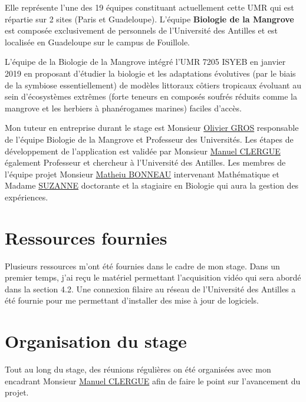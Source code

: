     \vspace{0.5cm}

    \begin{flushleft}
        Elle représente l'une des 19 équipes constituant actuellement cette UMR qui est répartie sur 2 sites (Paris et Guadeloupe). L'équipe \textbf{Biologie de la Mangrove} est composée exclusivement de personnels de l'Université des Antilles et est localisée en Guadeloupe sur le campus de Fouillole.

        \vspace{0.5cm}
        
        L'équipe de la Biologie de la Mangrove intégré l'UMR 7205 ISYEB en janvier 2019 en proposant d'étudier la biologie et les adaptations évolutives (par le biais de la symbiose essentiellement) de modèles littoraux côtiers tropicaux évoluant au sein d'écosystèmes extrêmes (forte teneurs en composés soufrés réduits comme la mangrove et les herbiers à phanérogames marines) faciles d'accès.
    
        \vspace{0.5cm}
    
        Mon tuteur en entreprise durant le stage est Monsieur \underline{Olivier GROS} responsable de l'équipe Biologie de la Mangrove et Professeur des Universités.
        Les étapes de développement de l'application est validée par Monsieur \underline{Manuel CLERGUE} également Professeur et chercheur à l'Université des Antilles.
        Les membres de l'équipe projet Monsieur \underline{Matheiu BONNEAU} intervenant Mathématique et Madame \underline{SUZANNE} doctorante et la stagiaire en Biologie qui aura la gestion des expériences.

    \end{flushleft}


    \section{Ressources fournies}
    Plusieurs ressources m'ont été fournies dans le cadre de mon stage.
    Dans un premier temps, j'ai reçu le matériel permettant l'acquisition vidéo qui sera abordé dans la section 4.2.
    Une connexion filaire au réseau de l'Université des Antilles a été fournie pour me permettant d'installer des mise à jour de logiciels.

    \section{Organisation du stage}
    Tout au long du stage, des réunions régulières on été organisées avec mon encadrant Monsieur \underline{Manuel CLERGUE} afin de faire le point sur l'avancement du projet.

